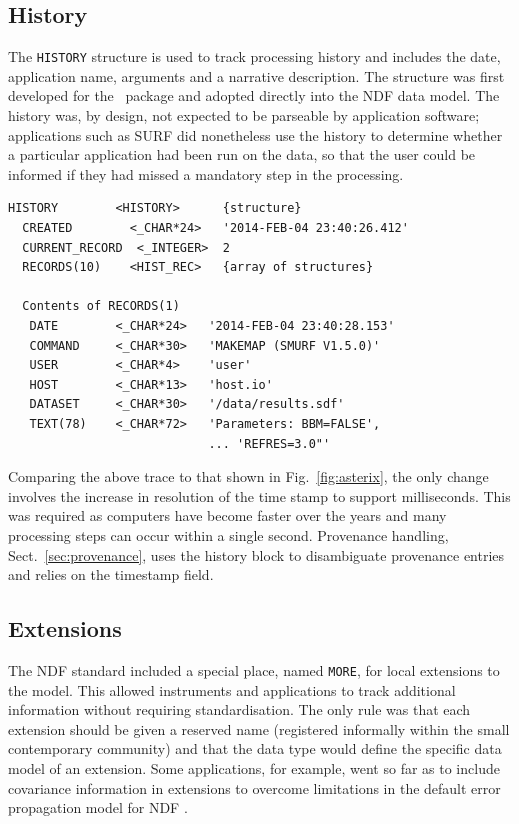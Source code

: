 \documentclass[final,authoryear,5p,times,twocolumn]{elsarticle}
\newcommand*\secref[1]{Sect.~\ref{#1}}
\begin{document}
\subsection{History}

The \texttt{HISTORY} structure is used to track processing history and
includes the date, application name, arguments and a narrative
description. The structure was first developed for the
\asterix\ package and adopted directly into the NDF data
model. The history was, by design, not expected to be parseable by
application software; applications such as SURF
\citep{1998ASPC..145..216J} did nonetheless use the history to determine whether a
particular application had been run on the data, so that the user could be
informed if they had missed a mandatory step in the processing.

{\small
\begin{verbatim}
HISTORY        <HISTORY>      {structure}
  CREATED        <_CHAR*24>   '2014-FEB-04 23:40:26.412'
  CURRENT_RECORD  <_INTEGER>  2
  RECORDS(10)    <HIST_REC>   {array of structures}

  Contents of RECORDS(1)
   DATE        <_CHAR*24>   '2014-FEB-04 23:40:28.153'
   COMMAND     <_CHAR*30>   'MAKEMAP (SMURF V1.5.0)'
   USER        <_CHAR*4>    'user'
   HOST        <_CHAR*13>   'host.io'
   DATASET     <_CHAR*30>   '/data/results.sdf'
   TEXT(78)    <_CHAR*72>   'Parameters: BBM=FALSE',
                            ... 'REFRES=3.0"'
\end{verbatim}
}

Comparing the above trace to that shown in Fig.~\ref{fig:asterix},
the only change involves the increase in resolution of the time
stamp to support milliseconds. This was required as computers have
become faster over the years and many processing steps can occur
within a single second. Provenance handling, \secref{sec:provenance},
uses the history block to disambiguate provenance entries and relies
on the timestamp field.

\subsection{Extensions}
\label{sec:more}

The NDF standard included a special place, named \texttt{MORE}, for local extensions to the
model. This allowed instruments and applications to track additional
information without requiring standardisation. The only rule was that
each extension should be given a reserved name (registered informally within the
  small contemporary community) and that the data type
would define the specific data model of an extension.
Some
applications, for example, went so far as to include covariance
information in extensions to overcome limitations in the default error
propagation model for NDF \citep[for example \specdre;][]{SUN140}.
\end{document}
